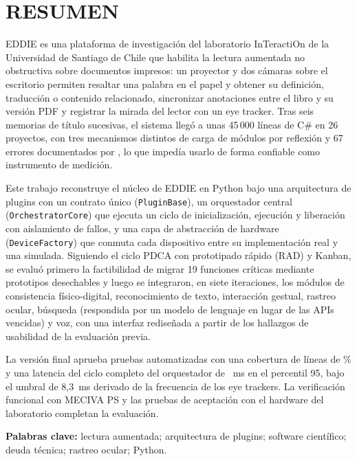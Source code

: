 \chapter*{RESUMEN}

EDDIE es una plataforma de investigación del laboratorio InTeractiOn de la Universidad de Santiago de Chile que habilita la lectura aumentada no obstructiva sobre documentos impresos: un proyector y dos cámaras sobre el escritorio permiten resaltar una palabra en el papel y obtener su definición, traducción o contenido relacionado, sincronizar anotaciones entre el libro y su versión PDF y registrar la mirada del lector con un eye tracker. Tras seis memorias de título sucesivas, el sistema llegó a unas 45\,000 líneas de C\# en 26 proyectos, con tres mecanismos distintos de carga de módulos por reflexión y 67 errores documentados por \citet{ibaceta2023}, lo que impedía usarlo de forma confiable como instrumento de medición.

Este trabajo reconstruye el núcleo de EDDIE en Python bajo una arquitectura de plugins con un contrato único (\texttt{PluginBase}), un orquestador central (\texttt{OrchestratorCore}) que ejecuta un ciclo de inicialización, ejecución y liberación con aislamiento de fallos, y una capa de abstracción de hardware (\texttt{DeviceFactory}) que conmuta cada dispositivo entre su implementación real y una simulada. Siguiendo el ciclo PDCA con prototipado rápido (RAD) y Kanban, se evaluó primero la factibilidad de migrar 19 funciones críticas mediante prototipos desechables y luego se integraron, en siete iteraciones, los módulos de consistencia físico-digital, reconocimiento de texto, interacción gestual, rastreo ocular, búsqueda (respondida por un modelo de lenguaje en lugar de las APIs vencidas) y voz, con una interfaz rediseñada a partir de los hallazgos de usabilidad de la evaluación previa.

La versión final aprueba \PSietePruebas{} pruebas automatizadas con una cobertura de líneas de \PSieteCobertura\% y una latencia del ciclo completo del orquestador de \PSieteCicloPnoventaycinco{}~ms en el percentil 95, bajo el umbral de 8,3~ms derivado de la frecuencia de los eye trackers. La verificación funcional con MECIVA PS y las pruebas de aceptación con el hardware del laboratorio completan la evaluación.

\vspace{1em}
\noindent\textbf{Palabras clave:} lectura aumentada; arquitectura de plugins; software científico; deuda técnica; rastreo ocular; Python.

